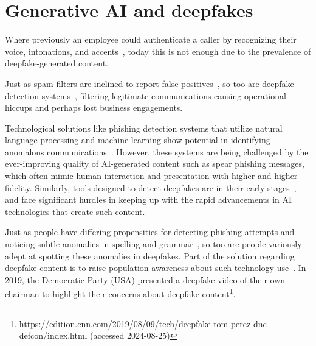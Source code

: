 \section{Generative AI and deepfakes}
\begin{comment}    
    - Deepfake content detection
    - Spear phishing detection
\end{comment}

Where previously an employee could authenticate a caller by recognizing their voice, intonations, and accents~\citep{mitnick_The_Art_of_Deception_2003}, today this is not enough due to the prevalence of deepfake-generated content.




Just as spam filters are inclined to report false positives~\citep{fakhouri_AI_Driven_Solutions_SE_Attacks_2024}, so too are deepfake detection systems~\citep{mirsky_Creation_Detection_Deepfakes_2021}, filtering legitimate communications causing operational hiccups and perhaps lost business engagements.

Technological solutions like phishing detection systems that utilize natural language processing and machine learning show potential in identifying anomalous communications~\citep{basit_Comprehensive_Survey_AI_Phishing_Detection_2021}. However, these systems are being challenged by the ever-improving quality of AI-generated content such as spear phishing messages, which often mimic human interaction and presentation with higher and higher fidelity. Similarly, tools designed to detect deepfakes are in their early stages~\citep{mirsky_Creation_Detection_Deepfakes_2021}, and face significant hurdles in keeping up with the rapid advancements in AI technologies that create such content.

Just as people have differing propensities for detecting phishing attempts and noticing subtle anomalies in spelling and grammar~\citep{nicholson_Investigating_Teenagers_Detect_Phishing_2020, neupane_Social_Disorders_Facilitate_SE_2018}, so too are people variously adept at spotting these anomalies in deepfakes. Part of the solution regarding deepfake content is to raise population awareness about such technology use~\citep{blauth_AI_Crime_Overview_Malicious_Use_Abuse_2022}. In 2019, the Democratic Party (USA) presented a deepfake video of their own chairman to highlight their concerns about deepfake content\footnote{https://edition.cnn.com/2019/08/09/tech/deepfake-tom-perez-dnc-defcon/index.html (accessed 2024-08-25)}.

